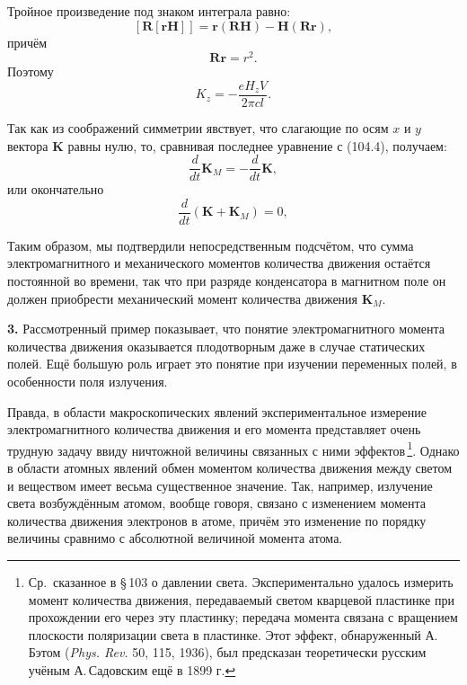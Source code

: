\documentclass[a4paper,12pt]{article}
\begin{document}
Тройное произведение под знаком интеграла равно:
$$
    [\mathbf{R}[\mathbf{r}\mathbf{H}]] = \mathbf{r}(\mathbf{R}\mathbf{H})
    - \mathbf{H}(\mathbf{R}\mathbf{r}),
$$
причём
$$
    \mathbf{R}\mathbf{r} = r^2.
$$
Поэтому
$$
    K_z = -\frac{eH_z V}{2\pi cl}.
$$


Так как из соображений симметрии явствует, что слагающие по осям
$x$ и $y$ вектора $\mathbf{K}$ равны нулю, то, сравнивая последнее
уравнение с (104.4), получаем:
$$
    \frac{d}{dt}\mathbf{K}_M = -\frac{d}{dt}\mathbf{K},
$$
или окончательно
\begin{equation}
    \frac{d}{dt}(\mathbf{K} + \mathbf{K}_M) = 0,
    \tag{104.5}
\end{equation}

Таким образом, мы подтвердили непосредственным подсчётом, что сумма
электромагнитного и механического моментов количества движения остаётся
постоянной во времени, так что при разряде конденсатора в магнитном поле
он должен приобрести механический момент количества движения $\mathbf{K}_M$.

\textbf{3.} Рассмотренный пример показывает, что понятие электромагнитного
момента количества движения оказывается плодотворным даже в случае
статических полей. Ещё большую роль играет это понятие при изучении
переменных полей, в особенности поля излучения.

Правда, в области макроскопических явлений экспериментальное измерение
электромагнитного количества движения и его момента представляет очень
трудную задачу ввиду ничтожной величины связанных с ними эффектов\,\footnote{Ср.\
сказанное в §\,103 о давлении света. Экспериментально удалось измерить
момент количества движения, передаваемый светом кварцевой пластинке при
прохождении его через эту пластинку; передача момента связана с вращением
плоскости поляризации света в пластинке. Этот эффект, обнаруженный А.\,Бэтом
(\textit{Phys. Rev.} 50, 115, 1936), был предсказан теоретически русским
учёным А.\,Садовским ещё в 1899 г.}. Однако в области атомных явлений
обмен моментом количества движения между светом и веществом имеет весьма
существенное значение. Так, например, излучение света возбуждённым
атомом, вообще говоря, связано с изменением момента количества движения
электронов в атоме, причём это изменение по порядку величины сравнимо
с абсолютной величиной момента атома.

\end{document}
